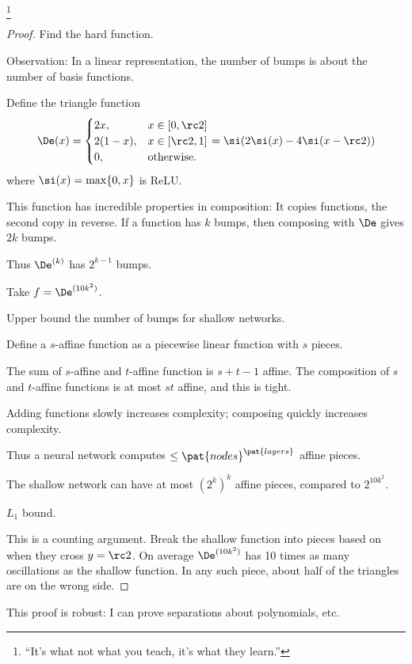 \footnote{``It's what not what you teach, it's what they learn.''}
\begin{proof}
 Find the hard function.

Observation: In a linear representation, the number of bumps is about the number of basis functions.

Define the triangle function 
$$
\De(x) = \begin{cases}
2x,&x\in [0,\rc 2]\\
2(1-x), & x\in [\rc 2, 1]\\
0,&\text{otherwise.}
\end{cases}
=\si(2\si(x)-4\si(x-\rc2))
$$
where $\si(x) = \max\{0,x\}$ is ReLU.

This function has incredible properties in composition: It copies functions, the second copy in reverse. If a function has $k$ bumps, then composing with $\De$ gives $2k$ bumps. 

Thus $\De^{(k)}$ has $2^{k-1}$ bumps.

Take $f=\De^{(10k^2)}$.

 Upper bound the number of bumps for shallow networks.

Define a $s$-affine function as a piecewise linear function with $s$ pieces.

The sum of $s$-affine and $t$-affine function is $s+t-1$ affine. The composition of $s$ and $t$-affine functions is at most $st$ affine, and this is tight.

Adding functions slowly increases complexity; composing quickly increases complexity. 

Thus a neural network computes $\le \pat{nodes}^{\pat{layers}}$ affine pieces.

The shallow network can have at most $(2^k)^k$ affine pieces, compared to $2^{10k^2}$.

 $L_1$ bound.

This is a counting argument. Break the shallow function into pieces based on when they cross $y=\rc 2$. 
On average $\De^{(10k^2)}$ has 
10 times as many oscillations as the shallow function. In any such piece, about half of the triangles are on the wrong side.
\end{proof}
This proof is robust: I can prove separations about polynomials, etc.


